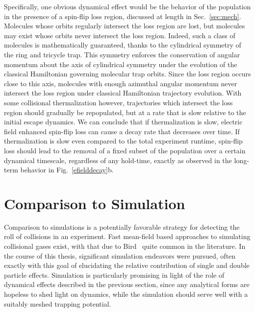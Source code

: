 Specifically, one obvious dynamical effect would be the behavior of the population in the presence of a spin-flip loss region, discussed at length in Sec.~\ref{sec:mech}.
Molecules whose orbits regularly intersect the loss region are lost, but molecules may exist whose orbits never intersect the loss region.
Indeed, such a class of molecules is mathematically guaranteed, thanks to the cylindrical symmetry of the ring and tricycle trap. 
This symmetry enforces the conservation of angular momentum about the axis of cylindrical symmetry under the evolution of the classical Hamiltonian governing molecular trap orbits.
Since the loss region occurs close to this axis, molecules with enough azimuthal angular momentum never intersect the loss region under classical Hamiltonian trajectory evolution.
With some collisional thermalization however, trajectories which intersect the loss region should gradually be repopulated, but at a rate that is slow relative to the initial escape dynamics.
We can conclude that if thermalization is slow, electric field enhanced spin-flip loss can cause a decay rate that decreases over time.
If thermalization is slow even compared to the total experiment runtime, spin-flip loss should lead to the removal of a fixed subset of the population over a certain dynamical timescale, regardless of any hold-time, exactly as observed in the long-term behavior in Fig.~\ref{efielddecay}b.

\section{Comparison to Simulation}

Comparison to simulations is a potentially favorable strategy for detecting the roll of collisions in an experiment.
Fast mean-field based approaches to simulating collisional gases exist, with that due to Bird~\cite{Bird1976} quite common in the literature.
In the course of this thesis, significant simulation endeavors were pursued, often exactly with this goal of elucidating the relative contribution of single and double particle effects.
Simulation is particularly promising in light of the role of dynamical effects described in the previous section, since any analytical forms are hopeless to shed light on dynamics, while the simulation should serve well with a suitably meshed trapping potential.

